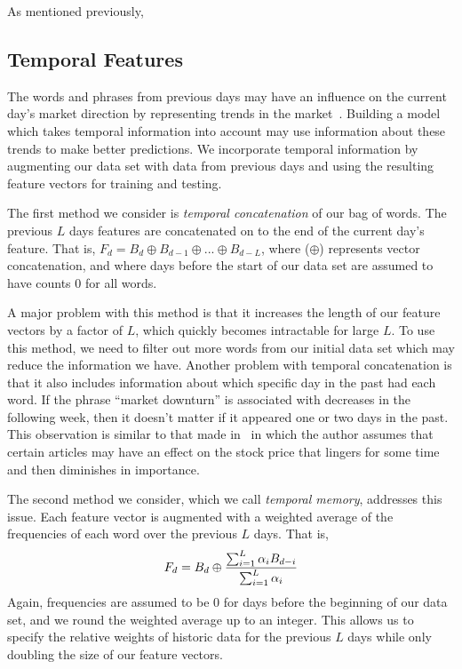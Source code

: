 \documentclass[10pt, twocolumn]{article}
\begin{document}
As mentioned previously,

\subsection{Temporal Features}

The words and phrases from previous days may have an influence on the current day's market direction by representing trends in the market~\cite{mlstockmarket}. Building a model which takes temporal information into account may use information about these trends to make better predictions. We incorporate temporal information by augmenting our data set with data from previous days and using the resulting feature vectors for training and testing.

The first method we consider is \textit{temporal concatenation} of our bag of words. The previous $L$ days features are concatenated on to the end of the current day's feature. That is, $F_{d} = B_{d} \oplus B_{d-1} \oplus ... \oplus B_{d-L}$, where ($\oplus$) represents vector concatenation, and where days before the start of our data set are assumed to have counts $0$ for all words.

A major problem with this method is that it increases the length of our feature vectors by a factor of $L$, which quickly becomes intractable for large $L$. To use this method, we need to filter out more words from our initial data set which may reduce the information we have. Another problem with temporal concatenation is that it also includes information about which specific day in the past had each word. If the phrase ``market downturn'' is associated with decreases in the following week, then it doesn't matter if it appeared one or two days in the past. This observation is similar to that made in~\cite{mlstockmarket} in which the author assumes that certain articles may have an effect on the stock price that lingers for some time and then diminishes in importance. 

The second method we consider, which we call \textit{temporal memory}, addresses this issue. Each feature vector is augmented with a weighted average of the frequencies of each word over the previous $L$ days. That is, $$\displaystyle F_{d} = B_{d} \oplus {{\sum^L_{i=1}{\alpha_i B_{d-i}}} \over {\sum^L_{i=1}{\alpha_i}}}$$ Again, frequencies are assumed to be 0 for days before the beginning of our data set, and we round the weighted average up to an integer. This allows us to specify the relative weights of historic data for the previous $L$ days while only doubling the size of our feature vectors. 
\end{document}
